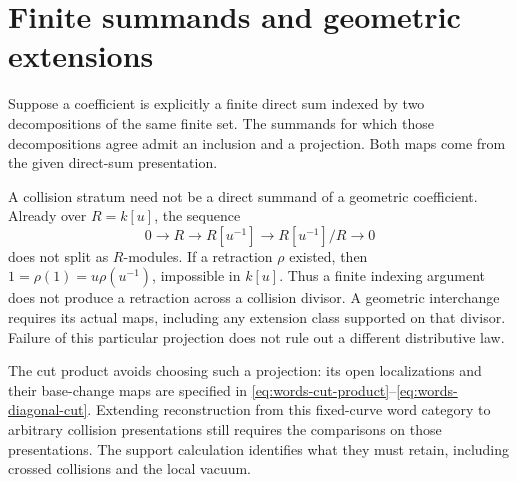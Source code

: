 \section{Finite summands and geometric extensions}

Suppose a coefficient is explicitly a finite direct sum indexed
by two decompositions of the same finite set.  The summands for
which those decompositions agree admit an inclusion and a
projection.  Both maps come from the given direct-sum presentation.

A collision stratum need not be a direct summand of a geometric
coefficient.  Already over \(R=k[u]\), the sequence
\[
 0\longrightarrow R\longrightarrow R[u^{-1}]
   \longrightarrow R[u^{-1}]/R\longrightarrow0
\]
does not split as \(R\)-modules.  If a retraction \(\rho\) existed,
then \(1=\rho(1)=u\rho(u^{-1})\), impossible in \(k[u]\).
Thus a finite indexing argument does not produce a retraction
across a collision divisor.  A geometric interchange requires
its actual maps, including any extension class supported on that
divisor.  Failure of this particular projection does not rule out
a different distributive law.

The cut product avoids choosing such a projection: its open
localizations and their base-change maps are specified in
\eqref{eq:words-cut-product}--\eqref{eq:words-diagonal-cut}.
Extending reconstruction from this fixed-curve word category to
arbitrary collision presentations still requires the comparisons
on those presentations.  The support calculation identifies what
they must retain, including crossed collisions and the local
vacuum.
